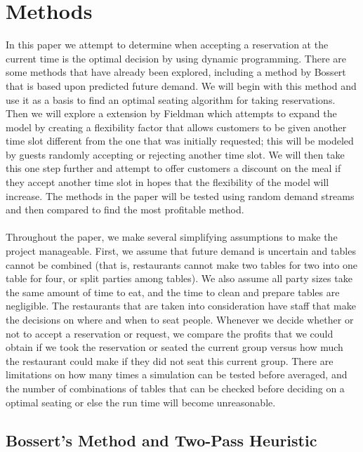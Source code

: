 \documentclass[12pt, titlepage]{article}
\begin{document}
\section{Methods}

In this paper we attempt to determine when accepting a reservation at the current time is the optimal decision by using dynamic programming. There are some methods that have already been explored, including a method by Bossert that is based upon predicted future demand. We will begin with this method and use it as a basis to find an optimal seating algorithm for taking reservations. Then we will explore a extension by Fieldman which attempts to expand the model by creating a flexibility factor that allows customers to be given another time slot different from the one that was initially requested; this will be modeled by guests randomly accepting or rejecting another time slot. We will then take this one step further and attempt to offer customers a discount on the meal if they accept another time slot in hopes that the flexibility of the model will increase. The methods in the paper will be tested using random demand streams and then compared to find the most profitable method.\\
 \\
Throughout the paper, we make several simplifying assumptions to make the project manageable. First, we assume that future demand is uncertain and tables cannot be combined (that is, restaurants cannot make two tables for two into one table for four, or split parties among tables). We also assume all party sizes take the same amount of time to eat, and the time to clean and prepare tables are negligible. The restaurants that are taken into consideration have staff that make the decisions on where and when to seat people. Whenever we decide whether or not to accept a reservation or request, we compare the profits that we could obtain if we took the reservation or seated the current group versus how much the restaurant could make if they did not seat this current group. There are limitations on how many times a simulation can be tested before averaged, and the number of combinations of tables that can be checked before deciding on a optimal seating or else the run time will become unreasonable.

\subsection{Bossert's Method and Two-Pass Heuristic }
\end{document}

